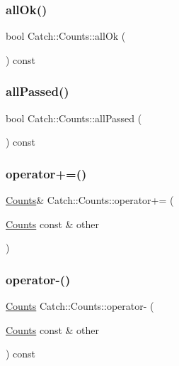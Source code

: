 \subsubsection{\texorpdfstring{all\+Ok()}{allOk()}}
{\footnotesize\ttfamily bool Catch\+::\+Counts\+::all\+Ok (\begin{DoxyParamCaption}{ }\end{DoxyParamCaption}) const}

\mbox{\label{struct_catch_1_1_counts_a84999490e0ecaa3de5e121bf48eda1b3}} 
\subsubsection{\texorpdfstring{all\+Passed()}{allPassed()}}
{\footnotesize\ttfamily bool Catch\+::\+Counts\+::all\+Passed (\begin{DoxyParamCaption}{ }\end{DoxyParamCaption}) const}

\mbox{\label{struct_catch_1_1_counts_a322a89475cd2cc039140ef371e973677}} 
\subsubsection{\texorpdfstring{operator+=()}{operator+=()}}
{\footnotesize\ttfamily \mbox{\hyperlink{struct_catch_1_1_counts}{Counts}}\& Catch\+::\+Counts\+::operator+= (\begin{DoxyParamCaption}\item[{\mbox{\hyperlink{struct_catch_1_1_counts}{Counts}} const \&}]{other }\end{DoxyParamCaption})}

\mbox{\label{struct_catch_1_1_counts_aaa10666f559057e3e860d2a5a6fae4c4}} 
\subsubsection{\texorpdfstring{operator-\/()}{operator-()}}
{\footnotesize\ttfamily \mbox{\hyperlink{struct_catch_1_1_counts}{Counts}} Catch\+::\+Counts\+::operator-\/ (\begin{DoxyParamCaption}\item[{\mbox{\hyperlink{struct_catch_1_1_counts}{Counts}} const \&}]{other }\end{DoxyParamCaption}) const}

